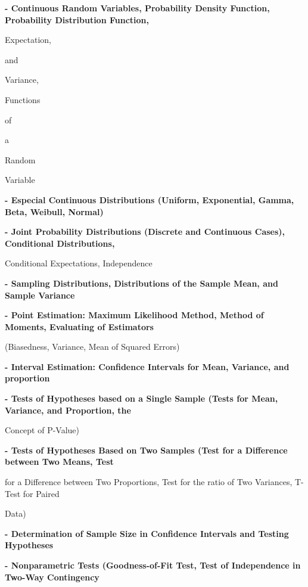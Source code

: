 \documentclass[12pt,a4paper]{article}
\begin{document}
\vspace{2pt}\textbf{- Continuous Random Variables, Probability Density Function, Probability Distribution Function,}\par
Expectation,\par
and\par
Variance,\par
Functions\par
of\par
a\par
Random\par
Variable\par
\vspace{2pt}\textbf{- Especial Continuous Distributions (Uniform, Exponential, Gamma, Beta, Weibull, Normal)}\par
\vspace{2pt}\textbf{- Joint Probability Distributions (Discrete and Continuous Cases), Conditional Distributions,}\par
Conditional Expectations, Independence\par
\vspace{2pt}\textbf{- Sampling Distributions, Distributions of the Sample Mean, and Sample Variance}\par
\vspace{2pt}\textbf{- Point Estimation: Maximum Likelihood Method, Method of Moments, Evaluating of Estimators}\par
(Biasedness, Variance, Mean of Squared Errors)\par
\vspace{2pt}\textbf{- Interval Estimation: Confidence Intervals for Mean, Variance, and proportion}\par
\vspace{2pt}\textbf{- Tests of Hypotheses based on a Single Sample (Tests for Mean, Variance, and Proportion, the}\par
Concept of P-Value)\par
\vspace{2pt}\textbf{- Tests of Hypotheses Based on Two Samples (Test for a Difference between Two Means, Test}\par
for a Difference between Two Proportions, Test for the ratio of Two Variances, T-Test for Paired\par
Data)\par
\vspace{2pt}\textbf{- Determination of Sample Size in Confidence Intervals and Testing Hypotheses}\par
\vspace{2pt}\textbf{- Nonparametric Tests (Goodness-of-Fit Test, Test of Independence in Two-Way Contingency}\par
\end{document}
